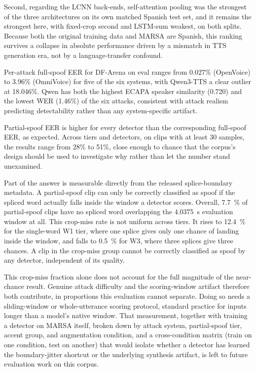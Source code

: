 \documentclass[11pt]{article}
\begin{document}
Second, regarding the LCNN back-ends, self-attention pooling was the strongest of the three architectures on
its own matched Spanish test set, and it remains the strongest here,
with fixed-crop second and LSTM-sum weakest, on both splits. Because
both the original training data and MARSA are Spanish, this ranking
survives a collapse in absolute performance driven by a mismatch in TTS
generation era, not by a language-transfer confound.

Per-attack full-spoof EER for DF-Arena on eval ranges from 0.027\%
(OpenVoice) to 3.96\% (OmniVoice) for five of the six systems, with
Qwen3-TTS a clear outlier at 18.046\%. Qwen has both the highest ECAPA
speaker similarity (0.720) and the lowest WER (1.46\%) of the six
attacks, consistent with attack realism
predicting detectability rather than any system-specific artifact.

Partial-spoof EER is higher for every detector than the corresponding
full-spoof EER, as expected. Across tiers and detectors, on clips with
at least 30 samples, the results range from 28\% to 51\%, close enough
to chance that the corpus's design should be used to investigate why
rather than let the number stand unexamined.

Part of the answer is measurable directly from the released
splice-boundary metadata. A partial-spoof clip can only be correctly
classified as spoof if the spliced word actually falls inside the
window a detector scores. Overall, \SI{7.7}{\percent} of partial-spoof
clips have no spliced word overlapping the \SI{4.0375}{\second}
evaluation window at all. This crop-miss rate is not uniform across
tiers. It rises to \SI{12.4}{\percent} for the single-word W1 tier,
where one splice gives only one chance of landing inside the window,
and falls to \SI{0.5}{\percent} for W3, where three splices give three
chances. A clip in the crop-miss group cannot be correctly classified
as spoof by any detector, independent of its quality.

This crop-miss fraction alone does not account for the full magnitude
of the near-chance result. Genuine attack difficulty and the
scoring-window artifact therefore both contribute, in proportions this
evaluation cannot separate. Doing so needs a sliding-window or
whole-utterance scoring protocol, standard practice for inputs longer
than a model's native window. That measurement, together with training
a detector on MARSA itself, broken down by attack system,
partial-spoof tier, accent group, and augmentation condition, and a
cross-condition matrix (train on one condition, test on another) that
would isolate whether a detector has learned the boundary-jitter
shortcut or the underlying synthesis artifact, is left to future
evaluation work on this corpus.
\end{document}

